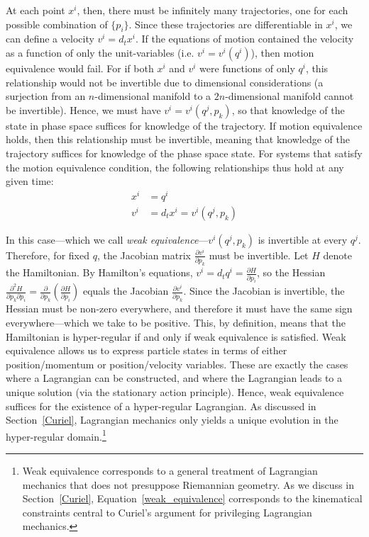 \documentclass[12pt, twoside]{article}
\begin{document}
At each point $x^i$, then, there must be infinitely many trajectories, one for each possible combination of $\{p_i\}$. Since these trajectories are differentiable in $x^i$, we can define a velocity $v^i = d_t x^i$. If the equations of motion contained the velocity as a function of only the unit-variables (i.e. $v^i=v^i(q^i)$), then motion equivalence would fail. For if both $x^i$ and $v^i$ were functions of only $q^i$, this relationship would not be invertible due to dimensional considerations (a surjection from an $n$-dimensional manifold to a $2n$-dimensional manifold cannot be invertible). Hence, we must have $v^i=v^i(q^j, p_k)$, so that knowledge of the state in phase space suffices for knowledge of the trajectory. If motion equivalence holds, then this relationship must be invertible, meaning that knowledge of the trajectory suffices for knowledge of the phase space state. For systems that satisfy the motion equivalence condition, the following relationships thus hold at any given time:
\begin{equation}\label{weak_equivalence}
\begin{aligned}
x^i &= q^i \\
v^i &= d_t x^i = v^i(q^j, p_k)
\end{aligned}
\end{equation}

In this case---which we call \textit{weak equivalence}---$v^i(q^j, p_k)$ is invertible at every $q^j$. Therefore, for fixed $q$, the Jacobian matrix  $\frac{\partial v^i}{\partial p_k}$ must be invertible. Let $H$ denote the Hamiltonian. By Hamilton's equations, $v^i = d_t q^i = \frac{\partial H}{\partial p_i}$, so the Hessian $\frac{\partial^2 H}{\partial p_k \partial p_i} = \frac{\partial}{\partial p_k} (\frac{\partial H}{\partial p_i})$ equals the Jacobian $\frac{\partial v^i}{\partial p_k}$. Since the Jacobian is invertible, the Hessian must be non-zero everywhere, and therefore it must have the same sign everywhere---which we take to be positive. {\color{green} This, by definition, means that the Hamiltonian is hyper-regular if and only if weak equivalence is satisfied.} Weak equivalence allows us to express particle states in terms of either position/momentum or position/velocity variables. These are exactly the cases where a Lagrangian can be constructed, and where the Lagrangian leads to a unique solution (via the stationary action principle). Hence, weak equivalence suffices for the existence of a hyper-regular Lagrangian. As discussed in Section~\ref{Curiel}, Lagrangian mechanics only yields a unique evolution in the hyper-regular domain.\footnote{Weak equivalence corresponds to a general treatment of Lagrangian mechanics that does not presuppose Riemannian geometry. As we discuss in Section~\ref{Curiel}, Equation~\ref{weak_equivalence} corresponds to the kinematical constraints central to Curiel's \parencites*[]{Curiel} argument for privileging Lagrangian mechanics.}
\end{document}
